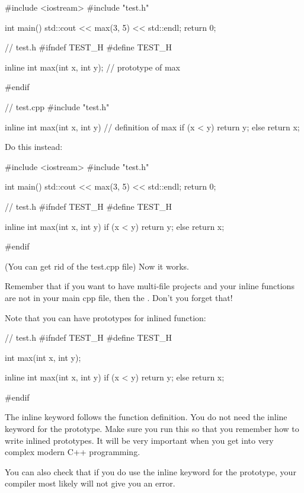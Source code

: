 \begin{consolethree}[escapeinside=||]
#include <iostream>
#include "test.h"

int main()
{
    std::cout << max(3, 5) << std::endl;
    return 0;
}
\end{consolethree}

\begin{consolethree}[escapeinside=||]
// test.h
#ifndef TEST_H
#define TEST_H

inline
int max(int x, int y); // prototype of max

#endif
\end{consolethree}

\begin{consolethree}[escapeinside=||]
// test.cpp
#include "test.h"

inline
int max(int x, int y) // definition of max
{
    if (x < y) return y;
    else return x;
}
\end{consolethree}

Do this instead:

\begin{consolethree}[escapeinside=||]
#include <iostream>
#include "test.h"

int main()
{
    std::cout << max(3, 5) << std::endl;
    return 0;
}
\end{consolethree}

\begin{consolethree}[escapeinside=||]
// test.h
#ifndef TEST_H
#define TEST_H

inline
int max(int x, int y)
{
    if (x < y) return y;
    else return x;
}

#endif
\end{consolethree}

(You can get rid of the test.cpp file) Now it works.

Remember that if you want to have multi-file projects and your inline functions are not in your main cpp file, then the . Don't you forget that!

Note that you can have prototypes for inlined function:

\begin{consolethree}[escapeinside=||]
// test.h
#ifndef TEST_H
#define TEST_H

int max(int x, int y);

inline
int max(int x, int y)
{
    if (x < y) return y;
    else return x;
}

#endif
\end{consolethree}

The inline keyword follows the function definition. You do not need the inline keyword for the prototype. Make sure you run this so that you remember how to write inlined prototypes. It will be very important when you get into very complex modern C++ programming.

You can also check that if you do use the inline keyword for the prototype, your compiler most likely will not give you an error.

